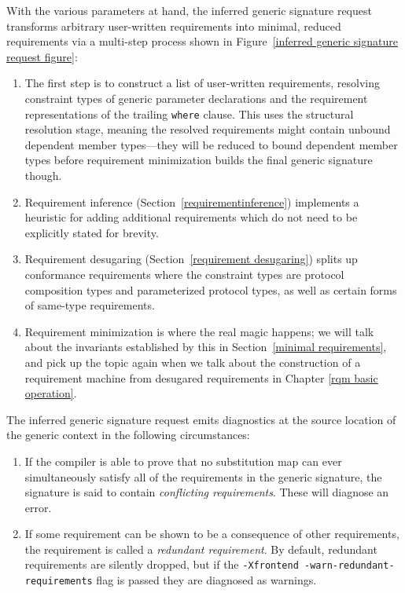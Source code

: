 \documentclass[../generics]{subfiles}
\begin{document}
With the various parameters at hand, the inferred generic signature request transforms arbitrary user-written requirements into minimal, reduced requirements via a multi-step process shown in Figure~\ref{inferred generic signature request figure}:
\begin{enumerate}
\item
{}%
%
The first step is to construct a list of user-written requirements, resolving constraint types of generic parameter declarations and the requirement representations of the trailing \texttt{where} clause. This uses the structural resolution stage, meaning the resolved requirements might contain unbound dependent member types---they will be reduced to bound dependent member types before requirement minimization builds the final generic signature though.
\item Requirement inference (Section~\ref{requirementinference}) implements a heuristic for adding additional requirements which do not need to be explicitly stated for brevity.
\item Requirement desugaring (Section~\ref{requirement desugaring}) splits up conformance requirements where the constraint types are protocol composition types and parameterized protocol types, as well as certain forms of same-type requirements.
\item Requirement minimization is where the real magic happens; we will talk about the invariants established by this in Section~\ref{minimal requirements}, and pick up the topic again when we talk about the construction of a requirement machine from desugared requirements in Chapter \ref{rqm basic operation}.
\end{enumerate}

%
%
%
The inferred generic signature request emits diagnostics at the source location of the generic context in the following circumstances:
\begin{enumerate}
\item If the compiler is able to prove that no substitution map can ever simultaneously satisfy all of the requirements in the generic signature, the signature is said to contain \emph{conflicting requirements}. These will diagnose an error.
\item If some requirement can be shown to be a consequence of other requirements, the requirement is called a \emph{redundant requirement}. By default, redundant requirements are silently dropped, but if the \texttt{-Xfrontend -warn-redundant-requirements} flag is passed they are diagnosed as warnings.
\end{enumerate}
\end{document}
